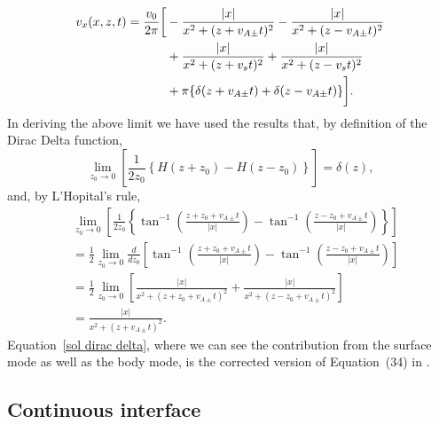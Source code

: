 \documentclass[12pt, draft]{../style-files/ociamthesis}
\begin{document}
\begin{align}
v_x(x, z, t) = \frac{v_0}{2\pi} \bigg[ &- \frac{|x|}{x^2 + (z + v_{A\pm}t)^2} - \frac{|x|}{x^2 + (z - v_{A\pm}t)^2} \notag \\
&+ \frac{|x|}{x^2 + (z + v_st)^2} + \frac{|x|}{x^2 + (z - v_st)^2} \notag \\
&+ \pi\{\delta(z + v_{A\pm}t) + \delta(z - v_{A\pm}t)\} \bigg]. \label{sol dirac delta}
\end{align}
In deriving the above limit we have used the results that, by definition of the Dirac Delta function,
\begin{equation}
\lim_{z_0 \to 0} \left[\frac{1}{2z_0} \left\{H(z + z_0) - H(z - z_0)\right\}\right] = \delta(z),
\end{equation}
and, by L'Hopital's rule,
\begin{align}
&\lim_{z_0 \to 0} \left[\frac{1}{2z_0}\left\{\tan^{-1}\left( \frac{z + z_0 + v_{A\pm}t}{|x|} \right) - \tan^{-1}\left( \frac{z - z_0 + v_{A\pm}t}{|x|} \right)\right\}\right] \\
&= \frac{1}{2} \lim_{z_0 \to 0} \frac{d}{dz_0} \left[\tan^{-1}\left( \frac{z + z_0 + v_{A\pm}t}{|x|} \right) - \tan^{-1}\left( \frac{z - z_0 + v_{A\pm}t}{|x|} \right)\right] \\
&= \frac{1}{2} \lim_{z_0 \to 0} \left[ \frac{|x|}{x^2 + (z + z_0 + v_{A\pm}t)^2} + \frac{|x|}{x^2 + (z - z_0 + v_{A\pm}t)^2} \right] \\
&= \frac{|x|}{x^2 + (z + v_{A\pm}t)^2}.
\end{align}
Equation~\eqref{sol dirac delta}, where we can see the contribution from the surface mode as well as the body mode, is the corrected version of Equation~(34) in \cite{rae_etal81}.






\color{red}
\subsection{Continuous interface}
\color{black}
\end{document}
